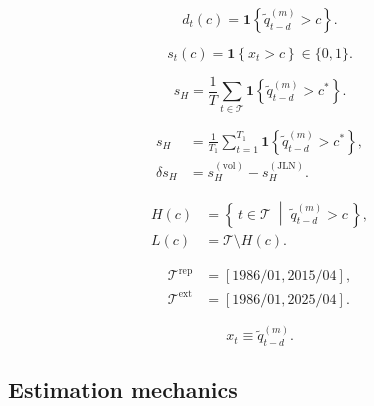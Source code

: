 \documentclass[
  11pt,
]{article}
\begin{document}
\begin{equation}\label{eq:c-star-indicator}
d_t(c) = \mathbf{1}\!\left\{ \tilde{q}_{t-d}^{(m)} > c \right\}.
\end{equation}

\begin{equation}\label{eq:s-t-c}
s_t(c) = \mathbf{1}\!\left\{ x_t > c \right\} \in \{0,1\}.
\end{equation}

\begin{equation}\label{eq:s-h}
s_H = \frac{1}{T}\sum_{t \in \mathcal{T}} \mathbf{1}\!\left\{ \tilde{q}_{t-d}^{(m)} > c^* \right\}.
\end{equation}

\begin{subequations}\label{eq:s-h-big}
\begin{align}
s_H &= \frac{1}{T_1}\sum_{t=1}^{T_1} \mathbf{1}\!\left\{\tilde{q}_{t-d}^{(m)} > c^*\right\}, \label{eq:s-h-share}\\
\delta s_H &= s_H^{(\mathrm{vol})} - s_H^{(\mathrm{JLN})}. \label{eq:s-h-diff}
\end{align}
\end{subequations}

\begin{subequations}\label{eq:H-L-sets}
\begin{align}
H(c) &= \left\{\, t \in \mathcal{T} \;\middle|\; \tilde{q}_{t-d}^{(m)} > c \,\right\}, \label{eq:H-set}\\
L(c) &= \mathcal{T} \setminus H(c). \label{eq:L-set}
\end{align}
\end{subequations}

\begin{equation}\label{eq:mathcal-t}
\begin{aligned}
\mathcal{T}^{\mathrm{rep}} &= [\text{1986/01}, \text{2015/04}], \\
\mathcal{T}^{\mathrm{ext}} &= [\text{1986/01}, \text{2025/04}].
\end{aligned}
\end{equation}

\begin{equation}\label{eq:x-t}
x_t \equiv \tilde{q}_{t-d}^{(m)}.
\end{equation}

\subsection{Estimation mechanics}\label{estimation-mechanics}
\end{document}
